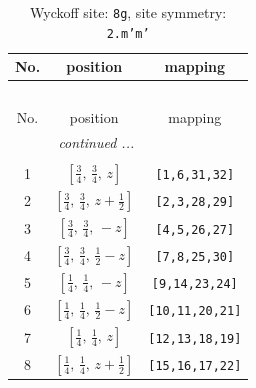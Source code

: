 \documentclass[fleqn,8pt]{jsarticle}
\begin{document}
\begin{longtable}{ccc}
\caption{Wyckoff site: {\tt 8g}, site symmetry: {\tt 2.m'm'}}
 \\
 \hline \hline
No. & position & mapping \\ \hline \endfirsthead

\multicolumn{2}{l}{\tablename\ \thetable{}} \\
 \hline \hline
No. & position & mapping \\ \hline \endhead

 \hline \hline
\multicolumn{2}{r}{\footnotesize\it continued ...} \\ \endfoot

 \hline \hline
\multicolumn{2}{r}{} \\ \endlastfoot

1 & $\left[ \frac{3}{4},\, \frac{3}{4},\, z \right]$ & {\tt [1,6,31,32]} \\ \hline
2 & $\left[ \frac{3}{4},\, \frac{3}{4},\, z + \frac{1}{2} \right]$ & {\tt [2,3,28,29]} \\ \hline
3 & $\left[ \frac{3}{4},\, \frac{3}{4},\, - z \right]$ & {\tt [4,5,26,27]} \\ \hline
4 & $\left[ \frac{3}{4},\, \frac{3}{4},\, \frac{1}{2} - z \right]$ & {\tt [7,8,25,30]} \\ \hline
5 & $\left[ \frac{1}{4},\, \frac{1}{4},\, - z \right]$ & {\tt [9,14,23,24]} \\ \hline
6 & $\left[ \frac{1}{4},\, \frac{1}{4},\, \frac{1}{2} - z \right]$ & {\tt [10,11,20,21]} \\ \hline
7 & $\left[ \frac{1}{4},\, \frac{1}{4},\, z \right]$ & {\tt [12,13,18,19]} \\ \hline
8 & $\left[ \frac{1}{4},\, \frac{1}{4},\, z + \frac{1}{2} \right]$ & {\tt [15,16,17,22]} \\
\end{longtable}
\renewcommand{\arraystretch}{1.2}
\end{document}
